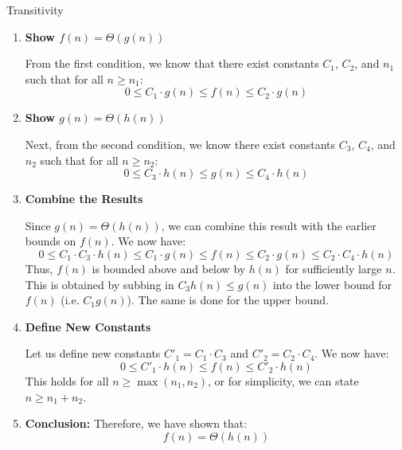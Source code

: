     \begin{derivation} Transitivity
        \begin{enumerate}
            \item \textbf{Show $f(n) = \Theta(g(n))$}
            
            From the first condition, we know that there exist constants $C_1$, $C_2$, and $n_1$ such that for all $n \geq n_1$:
            \[
            0 \leq C_1 \cdot g(n) \leq f(n) \leq C_2 \cdot g(n)
            \]
            
            \item \textbf{Show $g(n) = \Theta(h(n))$}
            
            Next, from the second condition, we know there exist constants $C_3$, $C_4$, and $n_2$ such that for all $n \geq n_2$:
            \[
            0 \leq C_3 \cdot h(n) \leq g(n) \leq C_4 \cdot h(n)
            \]
            
            \item \textbf{Combine the Results}
            
            Since $g(n) = \Theta(h(n))$, we can combine this result with the earlier bounds on $f(n)$. We now have:
            \[
            0 \leq C_1 \cdot C_3 \cdot h(n) \leq C_1 \cdot g(n) \leq f(n) \leq C_2 \cdot g(n) \leq C_2 \cdot C_4 \cdot h(n)
            \]
            Thus, $f(n)$ is bounded above and below by $h(n)$ for sufficiently large $n$. This is obtained by subbing in $C_3 h(n) \leq g(n)$ into the lower bound for $f(n)$ (i.e. $C_1 g(n)$). The same is done for the upper bound. 
            
            \item \textbf{Define New Constants}
            
            Let us define new constants $C'_1 = C_1 \cdot C_3$ and $C'_2 = C_2 \cdot C_4$. We now have:
            \[
            0 \leq C'_1 \cdot h(n) \leq f(n) \leq C'_2 \cdot h(n)
            \]
            This holds for all $n \geq \max(n_1, n_2)$, or for simplicity, we can state $n \geq n_1 + n_2$.
            
            \item \textbf{Conclusion:} Therefore, we have shown that:
                \[
                f(n) = \Theta(h(n))
                \]
        \end{enumerate}
            
    \end{derivation}

